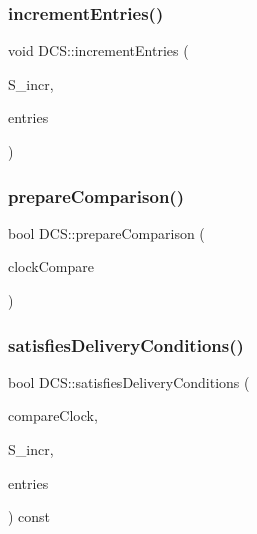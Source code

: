 \mbox{\label{classDCS_a7e537421b8edf48c1d00c859c9be53da}} 
\subsubsection{\texorpdfstring{increment\+Entries()}{incrementEntries()}}
{\footnotesize\ttfamily void D\+C\+S\+::increment\+Entries (\begin{DoxyParamCaption}\item[{const vector$<$ unsigned int $>$ \&}]{S\+\_\+incr,  }\item[{const vector$<$ unsigned int $>$ \&}]{entries }\end{DoxyParamCaption})}

\mbox{\label{classDCS_a8d66ffc382de5519aa7fb3844b6790af}} 
\subsubsection{\texorpdfstring{prepare\+Comparison()}{prepareComparison()}}
{\footnotesize\ttfamily bool D\+C\+S\+::prepare\+Comparison (\begin{DoxyParamCaption}\item[{\hyperlink{classDCS}{D\+CS}}]{clock\+Compare }\end{DoxyParamCaption})}

\mbox{\label{classDCS_aeb765d2361e829ba54620d99e2fb4bf1}} 
\subsubsection{\texorpdfstring{satisfies\+Delivery\+Conditions()}{satisfiesDeliveryConditions()}}
{\footnotesize\ttfamily bool D\+C\+S\+::satisfies\+Delivery\+Conditions (\begin{DoxyParamCaption}\item[{const \hyperlink{classDCS}{D\+CS} \&}]{compare\+Clock,  }\item[{const vector$<$ unsigned int $>$ \&}]{S\+\_\+incr,  }\item[{const vector$<$ unsigned int $>$ \&}]{entries }\end{DoxyParamCaption}) const}

